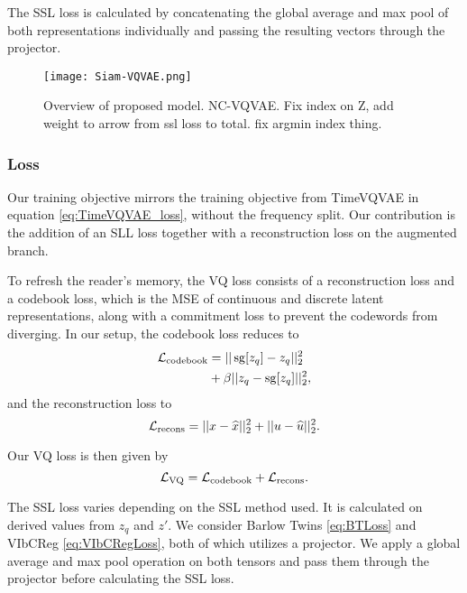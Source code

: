 \documentclass[../../thesis.tex]{subfiles}
\begin{document}
The SSL loss is calculated by concatenating the global average and max pool of both representations individually and passing the resulting vectors through the projector.\newline

\begin{figure}[h]
    \texttt{[image: Siam-VQVAE.png]}
    \centering  
    \caption{Overview of proposed model. NC-VQVAE. Fix index on Z, add weight to arrow from ssl loss to total. fix argmin index thing.}
    \label{fig:NCVQVAE}
\end{figure}

\subsubsection{Loss}
Our training objective mirrors the training objective from TimeVQVAE in equation \ref{eq:TimeVQVAE_loss}, without the frequency split. Our contribution is the addition of an SLL loss together with a reconstruction loss on the augmented branch.\newline

To refresh the reader's memory, the VQ loss consists of a reconstruction loss and a codebook loss, which is the MSE of continuous and discrete latent representations, along with a commitment loss to prevent the codewords from diverging. In our setup, the codebook loss reduces to
\begin{equation}
    \label{eq:NCVQVAE_codebook}
    \begin{aligned}
        \mathcal{L}_\text{codebook} &= ||\operatorname{sg}[z_q] - z_q ||_2^2 \\
                              &+ \beta||z_q - \operatorname{sg}[z_q]||_2^2,
    \end{aligned}
\end{equation}
and the reconstruction loss to
\begin{equation}
    \label{eq:NCVQVAE_recons}
        \mathcal{L}_\text{recons} = ||x - \widehat{x} ||_2^2 + ||u - \widehat{u}||_2^2.
\end{equation}

Our VQ loss is then given by
\begin{equation}
    \label{eq:NCVQVAE_loss}
    \mathcal{L}_\text{VQ} = \mathcal{L}_\text{codebook} + \mathcal{L}_\text{recons}.
\end{equation}

The SSL loss varies depending on the SSL method used. It is calculated on derived values from $z_q$ and $z'$. We consider Barlow Twins \ref{eq:BTLoss} and VIbCReg \ref{eq:VIbCRegLoss}, both of which utilizes a projector. We apply a global average and max pool operation on both tensors and pass them through the projector before calculating the SSL loss.\newline
\end{document}
